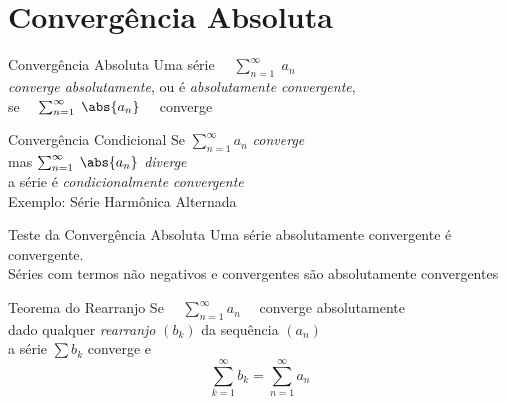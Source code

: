 \section{Convergência Absoluta}

\begin{frame}{Convergência Absoluta}
  Uma série
  \(\quad \sum_{n=1}^{\infty}\; a_n\) \\[5mm]
  \pause
  \emph{converge absolutamente}, ou é \emph{absolutamente convergente}, \\[5mm]
  \pause
  se
  \(\quad\sum_{n=1}^{\infty} \;\abs{a_n} \quad\) converge
\end{frame}

\begin{frame}{Convergência Condicional}
  Se  \tabto{12mm} \(\sum_{n=1}^{\infty} a_n\)          \tabto{32mm} \emph{converge} \\[9mm]
  \pause
  mas \tabto{12mm} \(\sum_{n=1}^{\infty} \;\abs{a_n} \) \tabto{32mm} \emph{diverge}  \\[9mm]
  \pause
  a série é \emph{condicionalmente convergente} \\[9mm]
  \pause
  Exemplo: Série Harmônica Alternada
\end{frame}

\begin{frame}{Teste da Convergência Absoluta}
  Uma série absolutamente convergente é convergente.\\[3mm]

  \pause
  \vspace{\baselineskip}
  Séries com termos não negativos e convergentes
  são absolutamente convergentes
\end{frame}

\begin{frame}{Teorema do Rearranjo}
Se \(\quad\sum_{n=1}^{\infty} a_n \quad \) converge absolutamente \\[5mm]

\pause
dado qualquer \emph{rearranjo} $(b_k)$ da sequência $(a_n)$ \\[5mm]

\pause
a série $\sum b_k$ converge e
\[
  \sum_{k=1}^{\infty} b_k = \sum_{n=1}^{\infty} a_n
\]
\end{frame}

